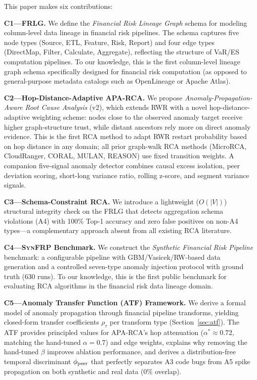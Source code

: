 \documentclass{article}
\newcommand{\aparca}{\textsc{APA-RCA}}
\newcommand{\synfrp}{\textsc{SynFRP}}
\begin{document}
This paper makes six contributions:

\textbf{C1---FRLG.}
We define the \emph{Financial Risk Lineage Graph} schema for modeling
column-level data lineage in financial risk pipelines.
The schema captures five node types (Source, ETL, Feature, Risk, Report)
and four edge types (DirectMap, Filter, Calculate, Aggregate), reflecting
the structure of VaR/ES computation pipelines.
To our knowledge, this is the first column-level lineage graph schema
specifically designed for financial risk computation (as opposed to
general-purpose metadata catalogs such as OpenLineage or Apache Atlas).

\textbf{C2---Hop-Distance-Adaptive \aparca{}.}
We propose \emph{Anomaly-Propagation-Aware Root Cause Analysis} (v2), which
extends RWR with a novel hop-distance-adaptive weighting scheme: nodes close
to the observed anomaly target receive higher graph-structure trust, while
distant ancestors rely more on direct anomaly evidence.
This is the first RCA method to adapt RWR restart probability based on
hop distance in any domain; all prior graph-walk RCA methods (MicroRCA,
CloudRanger, CORAL, MULAN, REASON) use fixed transition weights.
A companion five-signal anomaly detector combines causal excess isolation,
peer deviation scoring, short-long variance ratio, rolling z-score, and
segment variance signals.

\textbf{C3---Schema-Constraint RCA.}
We introduce a lightweight ($O(|V|)$) structural integrity check on the FRLG
that detects aggregation schema violations (A4) with 100\% Top-1 accuracy and
zero false positives on non-A4 types---a complementary approach absent from
all existing RCA literature.

\textbf{C4---\synfrp{} Benchmark.}
We construct the \emph{Synthetic Financial Risk Pipeline} benchmark: a
configurable pipeline with GBM/Vasicek/RW-based data generation and a
controlled seven-type anomaly injection protocol with ground truth (630 runs).
To our knowledge, this is the first public benchmark for evaluating RCA
algorithms in the financial risk data lineage domain.

\textbf{C5---Anomaly Transfer Function (ATF) Framework.}
We derive a formal model of anomaly propagation through financial pipeline
transforms, yielding closed-form transfer coefficients $\rho_\tau$ per
transform type (Section~\ref{sec:atf}).
The ATF provides principled values for \aparca{}'s hop attenuation
($\alpha^* \approx 0.72$, matching the hand-tuned $\alpha = 0.7$) and
edge weights, explains why removing the hand-tuned $\beta$ improves
ablation performance, and derives a distribution-free temporal
discriminant $\phi_{\rm peer}$ that perfectly separates A3 code bugs
from A5 spike propagation on both synthetic and real data (0\% overlap).
\end{document}
